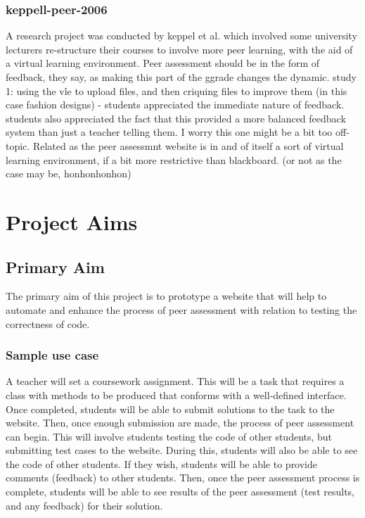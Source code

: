 \documentclass[a4paper,11pt]{report}
\begin{document}
\subsection{keppell-peer-2006}
A research project was conducted by keppel et al.\cite{keppell_peer_2006} which involved some university lecturers re-structure their courses to involve more peer learning, with the aid of a virtual learning environment. 
Peer assessment should be in the form of feedback, they say, as making this part of the ggrade changes the dynamic.
study 1: using the vle to upload files, and then criquing files to improve them (in this case fashion designs) - students appreciated the immediate nature of feedback. students also appreciated the fact that this provided a more balanced feedback system than just a teacher telling them. 
I worry this one might be a bit too off-topic.
Related as the peer assessmnt website is in and of itself a sort of virtual learning environment, if a bit more restrictive than blackboard. (or not as the case may be, honhonhonhon)


\chapter{Project Aims}
\section{Primary Aim}
The primary aim of this project is to prototype a website that will help to automate and enhance the process of peer assessment with relation to testing the correctness of code.
\subsection*{Sample use case}
A teacher will set a coursework assignment. This will be a task that requires a class with methods to be produced that conforms with a well-defined interface. Once completed, students will be able to submit solutions to the task to the website. Then, once enough submission are made, the process of peer assessment can begin. This will involve students testing the code of other students, but submitting test cases to the website. During this, students will also be able to see the code of other students. If they wish, students will be able to provide comments (feedback) to other students. Then, once the peer assessment process is complete, students will be able to see results of the peer assessment (test results, and any feedback) for their solution.
\end{document}
